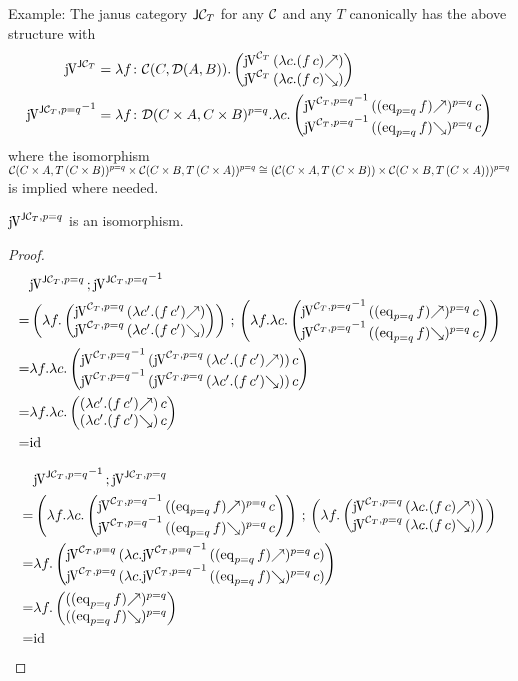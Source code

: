 \documentclass[runningheads,envcountsame]{llncs}
\begin{document}
Example: The janus category $\mathsf{J}\mathcal{C}_T$ for any $\mathcal{C}$ and any $T$ canonically has the above structure with 
\begin{align}
    \juncurry[\JC_T] &= \lambda f\colon \homC{C}{\homD{A}{B}}. \janus{\juncurry[\C_T]\,(\lambda c. \f{(f\,c)})}{\juncurry[\C_T]\,(\lambda c. \b{(f\,c)})} \\
    {\juncurry[\JC_T, p=q]}^{-1} &= \lambda f\colon \homD{C \times A}{C \times B}^{p=q}. \lambda c. \janus{{\juncurry[\C_T, p=q]}^{-1}\,(\f{(\mathrm{eq}_{p=q}\,f)})^{p=q}\,c}{{\juncurry[\C_T, p=q]}^{-1}\,(\b{(\mathrm{eq}_{p=q}\,f)})^{p=q}\,c}
\end{align}
where the isomorphism $
    \mathcal{C}(C \times A, T\,(C \times B))^{p=q} \times \mathcal{C}(C \times B, T\,(C \times A))^{p=q} \cong (\mathcal{C}(C \times A, T\,(C \times B)) \times \mathcal{C}(C \times B, T\,(C \times A)))^{p=q}
    $ is implied where needed.

\begin{lemma}
    $\juncurry[\JC_T, p=q]$ is an isomorphism.
\end{lemma}
\begin{proof}

\begin{align}
    & \comp{\juncurry[\JC_T, p=q]}{{\juncurry[\JC_T, p=q]}^{-1}} \\
  = & \comp{\left(\lambda f. \janus{\juncurry[\C_T, p=q]\,(\lambda c'. \f{(f\,c')})}{\juncurry[\C_T, p=q]\,(\lambda c'. \b{(f\,c')})}\right)}{\left(\lambda f. \lambda c. \janus{{\juncurry[\C_T, p=q]}^{-1}\,(\f{(\mathrm{eq}_{p=q}\,f)})^{p=q}\,c}{{\juncurry[\C_T, p=q]}^{-1}\,(\b{(\mathrm{eq}_{p=q}\,f)})^{p=q}\,c}\right)} \\
  = & \lambda f. \lambda c. \janus{{\juncurry[\C_T, p=q]}^{-1}\,(\juncurry[\C_T, p=q]\,(\lambda c'. \f{(f\,c')}))\,c}{{\juncurry[\C_T, p=q]}^{-1}\,(\juncurry[\C_T, p=q]\,(\lambda c'. \b{(f\,c')}))\,c} \\
  = & \lambda f. \lambda c. \janus{(\lambda c'. \f{(f\,c')})\,c}{(\lambda c'. \b{(f\,c')})\,c} \\
  = & \id
\end{align}

\begin{align}
    & \comp{{\juncurry[\JC_T, p=q]}^{-1}}{\juncurry[\JC_T, p=q]} \\
  = & \comp{\left(\lambda f. \lambda c. \janus{{\juncurry[\C_T, p=q]}^{-1}\,(\f{(\mathrm{eq}_{p=q}\,f)})^{p=q}\,c}{{\juncurry[\C_T, p=q]}^{-1}\,(\b{(\mathrm{eq}_{p=q}\,f)})^{p=q}\,c}\right)}{\left(\lambda f. \janus{\juncurry[\C_T, p=q]\,(\lambda c. \f{(f\,c)})}{\juncurry[\C_T, p=q]\,(\lambda c. \b{(f\,c)})}\right)} \\
  = & \lambda f. \janus{\juncurry[\C_T, p=q]\,(\lambda c. {\juncurry[\C_T, p=q]}^{-1}\,(\f{(\mathrm{eq}_{p=q}\,f)})^{p=q}\,c)}{\juncurry[\C_T, p=q]\,(\lambda c. {\juncurry[\C_T, p=q]}^{-1}\,(\b{(\mathrm{eq}_{p=q}\,f)})^{p=q}\,c)} \\
  = & \lambda f. \janus{(\f{(\mathrm{eq}_{p=q}\,f)})^{p=q}}{(\b{(\mathrm{eq}_{p=q}\,f)})^{p=q}} \\
  = & \id
\end{align}
\end{proof}
\end{document}
